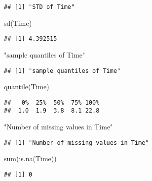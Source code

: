 \documentclass[
]{article}
\newenvironment{Shaded}{\begin{snugshade}}{\end{snugshade}}
\newcommand{\FunctionTok}[1]{\textcolor[rgb]{0.00,0.00,0.00}{#1}}
\newcommand{\NormalTok}[1]{#1}
\newcommand{\StringTok}[1]{\textcolor[rgb]{0.31,0.60,0.02}{#1}}
\begin{document}
\begin{verbatim}
## [1] "STD of Time"
\end{verbatim}

\begin{Shaded}
\begin{Highlighting}[]
\FunctionTok{sd}\NormalTok{(Time)}
\end{Highlighting}
\end{Shaded}

\begin{verbatim}
## [1] 4.392515
\end{verbatim}

\begin{Shaded}
\begin{Highlighting}[]
\StringTok{"sample quantiles of Time"}
\end{Highlighting}
\end{Shaded}

\begin{verbatim}
## [1] "sample quantiles of Time"
\end{verbatim}

\begin{Shaded}
\begin{Highlighting}[]
\FunctionTok{quantile}\NormalTok{(Time)}
\end{Highlighting}
\end{Shaded}

\begin{verbatim}
##   0%  25%  50%  75% 100% 
##  1.0  1.9  3.8  8.1 22.8
\end{verbatim}

\begin{Shaded}
\begin{Highlighting}[]
\StringTok{"Number of missing values in Time"}
\end{Highlighting}
\end{Shaded}

\begin{verbatim}
## [1] "Number of missing values in Time"
\end{verbatim}

\begin{Shaded}
\begin{Highlighting}[]
\FunctionTok{sum}\NormalTok{(}\FunctionTok{is.na}\NormalTok{(Time))}
\end{Highlighting}
\end{Shaded}

\begin{verbatim}
## [1] 0
\end{verbatim}
\end{document}
